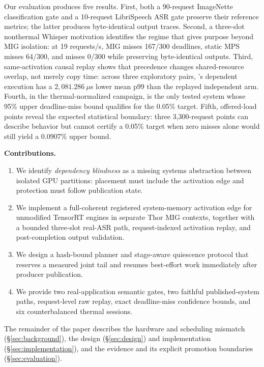 Our evaluation produces five results.  First, both a 90-request ImageNette
classification gate and a 10-request LibriSpeech ASR gate preserve their
reference metrics; the latter produces byte-identical output traces.  Second,
a three-slot nonthermal Whisper motivation identifies the regime that gives
\sys purpose beyond MIG isolation: at 19 requests/s, MIG misses 167/300
deadlines, static MPS misses 64/300, and \sys misses 0/300 while preserving
byte-identical outputs.  Third, same-activation causal replay shows that
precedence changes shared-resource overlap, not merely copy time: across three
exploratory pairs, \sys's
dependent execution has a $2{,}081.286~\mu$s lower mean p99 than the replayed
independent arm.  Fourth, in the thermal-normalized campaign, \sys is the only
tested system whose 95\% upper deadline-miss bound qualifies for the 0.05\%
target.  Fifth, offered-load points reveal the expected statistical boundary:
three 3,300-request points can describe behavior but cannot certify a
0.05\% target when zero misses alone would still yield a 0.0907\% upper bound.

\noindent\textbf{Contributions.}
\begin{enumerate}[leftmargin=*,itemsep=1pt,topsep=2pt]
  \item We identify \emph{dependency blindness} as a missing systems
  abstraction between isolated GPU partitions: placement must include the
  activation edge and protection must follow publication state.
  \item We implement a full-coherent registered system-memory activation edge
  for unmodified TensorRT engines in separate Thor MIG contexts, together with
  a bounded three-slot real-ASR path, request-indexed activation replay, and
  post-completion output validation.
  \item We design a hash-bound planner and stage-aware quiescence protocol that
  reserves a measured joint tail and resumes best-effort work immediately
  after producer publication.
  \item We provide two real-application semantic gates, two faithful
  published-system paths, request-level raw replay, exact deadline-miss
  confidence bounds, and six counterbalanced thermal sessions.
\end{enumerate}

The remainder of the paper describes the hardware and scheduling mismatch
(\S\ref{sec:background}), the \sys design (\S\ref{sec:design}) and
implementation (\S\ref{sec:implementation}), and the evidence and its explicit
promotion boundaries (\S\ref{sec:evaluation}).
